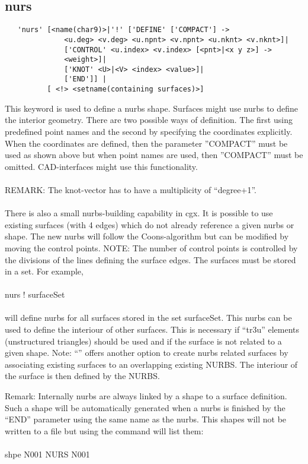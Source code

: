 \documentclass{article}
\begin{document}
\subsection{\label{nurs}nurs}
\begin{verbatim}
   'nurs' [<name(char9)>|'!' ['DEFINE' ['COMPACT'] ->
              <u.deg> <v.deg> <u.npnt> <v.npnt> <u.nknt> <v.nknt>]|
              ['CONTROL' <u.index> <v.index> [<pnt>|<x y z>] ->
              <weight>]|
              ['KNOT' <U>|<V> <index> <value>]|
              ['END']] |
          [ <!> <setname(containing surfaces)>]
\end{verbatim}
This keyword is used to define a nurbs shape. Surfaces might use nurbs to define the interior geometry. There are two possible ways of definition. The first using predefined point names and the second by specifying the coordinates explicitly. When the coordinates are defined, then the parameter ''COMPACT'' must be used as shown above but when point names are used, then ''COMPACT'' must be omitted. CAD-interfaces might use this functionality.\\\\REMARK: The knot-vector has to have a multiplicity of ``degree+1''.\\\\
There is also a small nurbs-building capability in cgx. It is possible to use
existing surfaces (with 4 edges) which do not already reference a given
nurbs or shape. The new nurbs will follow the Coons-algorithm but can be modified by
moving the control points. NOTE: The number of control points is controlled by the
divisions of the lines defining the surface edges. The surfaces must be stored in a set. For
example,\\\\nurs ! surfaceSet\\\\will define nurbs for all surfaces stored in
the set surfaceSet. This nurbs can be used to define the interiour of other
surfaces. This is necessary if ``tr3u'' elements (unstructured triangles)
should be used and if the surface is not related to a given shape. Note:
``'' offers another option to create nurbs related
surfaces by associating existing surfaces to an overlapping existing
NURBS. The interiour of the surface is then defined by the NURBS.

Remark: Internally nurbs are always linked by a shape to a surface definition. Such a shape will be automatically generated when a nurbs is finished by the ``END'' parameter using the same name as the nurbs. This shapes will not be written to a file but using the  command will list them:\\\\shpe N001 NURS N001
\end{document}

